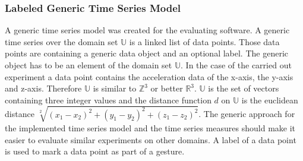 \subsubsection{Labeled Generic Time Series Model} \label{labeled_generic_time_series_model}
A generic time series model was created for the evaluating software. A generic time series over the domain set
$\mathbb{U}$ is a linked list of data points. Those data points are containing a generic data object and an
optional label. The generic object has to be an element of the domain set $\mathbb{U}$. In the case of the carried out
experiment a data point contains the acceleration data of the x-axis, the y-axis and z-axis. Therefore $\mathbb{U}$ is
similar to $\mathbb{Z}^3$ or better $\mathbb{R}^3$. $\mathbb{U}$ is the set of vectors containing three integer
values and the distance function $d$ on $\mathbb{U}$ is the euclidean distance
$\sqrt[2]{(x_1 - x_2)^2 + (y_1 - y_2)^2 + (z_1 - z_2)^2}$. The generic approach for the implemented time series model
and the time series measures should make it easier to evaluate similar experiments on other domains. A label of a data
point is used to mark a data point as part of a gesture.
